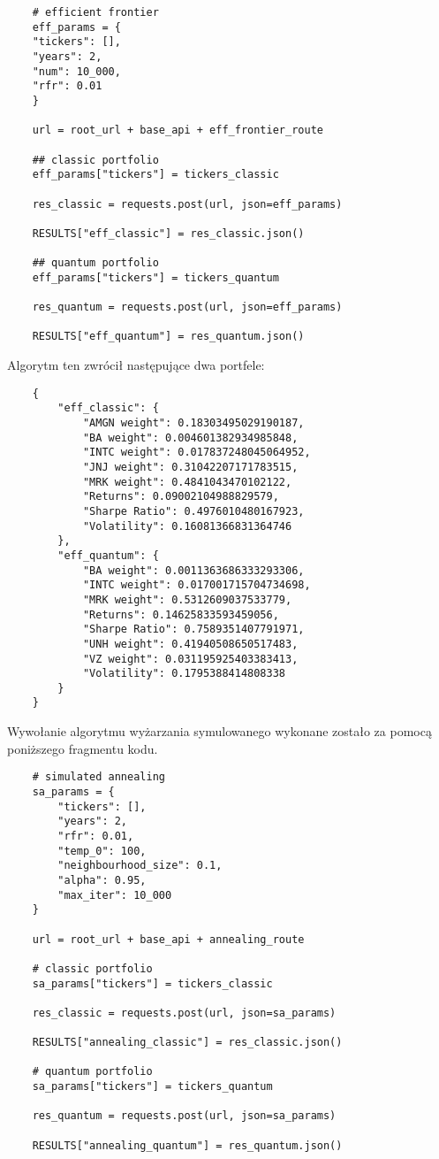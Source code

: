 \documentclass[12pt,a4paper,twoside,openany]{book}
\begin{document}
\begin{verbatim}
    # efficient frontier
    eff_params = {
    "tickers": [],
    "years": 2,
    "num": 10_000,
    "rfr": 0.01
    }
    
    url = root_url + base_api + eff_frontier_route

    ## classic portfolio
    eff_params["tickers"] = tickers_classic
    
    res_classic = requests.post(url, json=eff_params)
    
    RESULTS["eff_classic"] = res_classic.json()
    
    ## quantum portfolio
    eff_params["tickers"] = tickers_quantum
    
    res_quantum = requests.post(url, json=eff_params)
    
    RESULTS["eff_quantum"] = res_quantum.json()
\end{verbatim}

Algorytm ten zwrócił następujące dwa portfele:

\begin{verbatim}
    {
        "eff_classic": {
            "AMGN weight": 0.18303495029190187,
            "BA weight": 0.004601382934985848,
            "INTC weight": 0.017837248045064952,
            "JNJ weight": 0.31042207171783515,
            "MRK weight": 0.4841043470102122,
            "Returns": 0.09002104988829579,
            "Sharpe Ratio": 0.4976010480167923,
            "Volatility": 0.16081366831364746
        },
        "eff_quantum": {
            "BA weight": 0.0011363686333293306,
            "INTC weight": 0.017001715704734698,
            "MRK weight": 0.5312609037533779,
            "Returns": 0.14625833593459056,
            "Sharpe Ratio": 0.7589351407791971,
            "UNH weight": 0.41940508650517483,
            "VZ weight": 0.031195925403383413,
            "Volatility": 0.1795388414808338
        }
    }
\end{verbatim}

Wywołanie algorytmu wyżarzania symulowanego wykonane zostało za pomocą poniższego fragmentu kodu.

\begin{verbatim}
    # simulated annealing
    sa_params = {
        "tickers": [],
        "years": 2,
        "rfr": 0.01,
        "temp_0": 100,
        "neighbourhood_size": 0.1,
        "alpha": 0.95,
        "max_iter": 10_000
    }
    
    url = root_url + base_api + annealing_route

    # classic portfolio
    sa_params["tickers"] = tickers_classic
    
    res_classic = requests.post(url, json=sa_params)
    
    RESULTS["annealing_classic"] = res_classic.json()
    
    # quantum portfolio
    sa_params["tickers"] = tickers_quantum
    
    res_quantum = requests.post(url, json=sa_params)
    
    RESULTS["annealing_quantum"] = res_quantum.json()
\end{verbatim}
\end{document}
